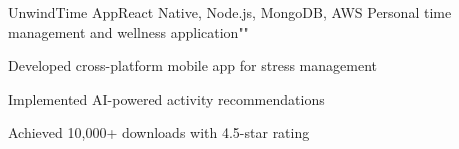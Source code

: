 \resumeSubheading
  {UnwindTime App}{React Native, Node.js, MongoDB, AWS}
  {Personal time management and wellness application}{""}
  \vspace{\experienceItemSpacing}
  \resumeItemListStart
\item Developed cross-platform mobile app for stress management
\item Implemented AI-powered activity recommendations
\item Achieved 10,000+ downloads with 4.5-star rating
  \resumeItemListEnd